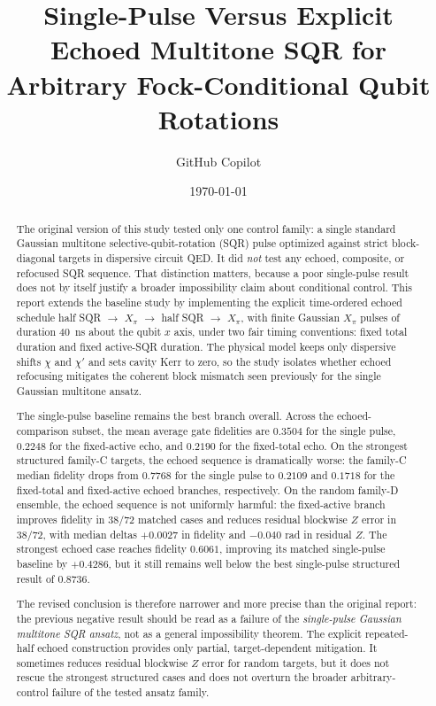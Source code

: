 \documentclass[aps,pra,twocolumn,reprint,floatfix,amsmath,amssymb]{revtex4-2}
\begin{document}
\title{Single-Pulse Versus Explicit Echoed Multitone SQR for Arbitrary Fock-Conditional Qubit Rotations}
\author{GitHub Copilot}
\date{\today}

\begin{abstract}
The original version of this study tested only one control family: a single standard Gaussian multitone selective-qubit-rotation (SQR) pulse optimized against strict block-diagonal targets in dispersive circuit QED. It did \emph{not} test any echoed, composite, or refocused SQR sequence. That distinction matters, because a poor single-pulse result does not by itself justify a broader impossibility claim about conditional control. This report extends the baseline study by implementing the explicit time-ordered echoed schedule half SQR \(\rightarrow\) \(X_\pi\) \(\rightarrow\) half SQR \(\rightarrow\) \(X_\pi\), with finite Gaussian \(X_\pi\) pulses of duration \SI{40}{ns} about the qubit \(x\) axis, under two fair timing conventions: fixed total duration and fixed active-SQR duration. The physical model keeps only dispersive shifts \(\chi\) and \(\chi'\) and sets cavity Kerr to zero, so the study isolates whether echoed refocusing mitigates the coherent block mismatch seen previously for the single Gaussian multitone ansatz.

The single-pulse baseline remains the best branch overall. Across the echoed-comparison subset, the mean average gate fidelities are \(0.3504\) for the single pulse, \(0.2248\) for the fixed-active echo, and \(0.2190\) for the fixed-total echo. On the strongest structured family-C targets, the echoed sequence is dramatically worse: the family-C median fidelity drops from \(0.7768\) for the single pulse to \(0.2109\) and \(0.1718\) for the fixed-total and fixed-active echoed branches, respectively. On the random family-D ensemble, the echoed sequence is not uniformly harmful: the fixed-active branch improves fidelity in \(38/72\) matched cases and reduces residual blockwise \(Z\) error in \(38/72\), with median deltas \(+0.0027\) in fidelity and \(-0.040\) rad in residual \(Z\). The strongest echoed case reaches fidelity \(0.6061\), improving its matched single-pulse baseline by \(+0.4286\), but it still remains well below the best single-pulse structured result of \(0.8736\).

The revised conclusion is therefore narrower and more precise than the original report: the previous negative result should be read as a failure of the \emph{single-pulse Gaussian multitone SQR ansatz}, not as a general impossibility theorem. The explicit repeated-half echoed construction provides only partial, target-dependent mitigation. It sometimes reduces residual blockwise \(Z\) error for random targets, but it does not rescue the strongest structured cases and does not overturn the broader arbitrary-control failure of the tested ansatz family.
\end{abstract}
\end{document}
